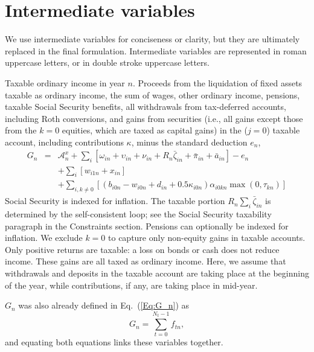 \documentclass[fleqn,12pt]{report}
\begin{document}
\section{Intermediate variables}
We use intermediate variables for conciseness or clarity,
but they are ultimately replaced in the final formulation.
Intermediate variables are represented in roman uppercase letters, or in double stroke uppercase letters.
\begin{description}[leftmargin=4em,style=multiline]
\item [$G_n$]
	Taxable ordinary income in year $n$. Proceeds from the liquidation of fixed assets taxable
	as ordinary income, the sum of wages, other ordinary income, pensions, taxable Social Security benefits, all withdrawals
	from tax-deferred accounts, including Roth conversions, and gains from securities
	(i.e., all gains except those from the $k=0$ equities, which are taxed as capital gains)
	in the ($j=0$) taxable account, including contributions $\kappa$, minus the standard deduction $e_n$,
	\begin{eqnarray}
		\label{Eq:Tx2}
		G_n &=&  \mathcal{A}_n^x +
		\sum_i [\omega_{in} + \upsilon_{in} + \nu_{in} + R_n\bar\zeta_{in} + \bar{\pi}_{in} + \bar{a}_{in}]
		- e_n
		\nonumber \\
		&& + \sum_i [w_{i1n} + x_{in}]
		\nonumber \\
		&& + \sum_{i,k\neq 0}
		[(b_{i0n} - w_{i0n} + d_{in} + 0.5\kappa_{i0n})\alpha_{i0kn}\max(0, \tau_{kn})]
	\end{eqnarray}
	Social Security is indexed for inflation.
	The taxable portion $R_n\sum_i\bar{\zeta}_{in}$ is determined by the
	self-consistent loop; see the Social Security taxability paragraph in the Constraints section.
	Pensions can optionally be indexed for inflation.
	We exclude $k=0$ to capture only non-equity gains in taxable accounts.
	Only positive returns are taxable: a loss on bonds or cash does not reduce income.
	These gains are all taxed as ordinary income. Here, we assume that
	withdrawals and deposits in the taxable account are taking place at the beginning of the year, while
	contributions, if any, are taking place in mid-year.

        $G_n$ was also already defined in Eq.~(\ref{Eq:G_n}) as
	\begin{equation*}
		G_n = \sum_{t=0}^{N_t-1} f_{tn},
	\end{equation*}
        and equating both equations links these variables together.


\end{description}
\end{document}
